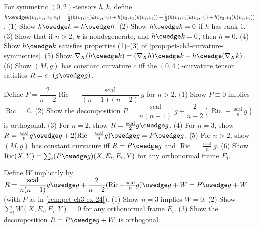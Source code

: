 \begin{remark}
  \label{rem:pet-ch3-ex-23}
  \leanok
  For symmetric $(0,2)$-tensors $h,k$, define
  $h\owedge k(v_1,v_2,v_3,v_4)=\tfrac12(h(v_1,v_4)k(v_2,v_3)+h(v_2,v_3)k(v_1,v_4))
  -\tfrac12(h(v_1,v_3)k(v_2,v_4)+h(v_2,v_4)k(v_1,v_3))$. (1) Show $h\owedge
  k=k\owedge h$. (2) Show $h\owedge h=0$ if $h$ has rank $1$. (3) Show that if
  $n>2$, $k$ is nondegenerate, and $h\owedge k=0$, then $h=0$. (4) Show $h\owedge
  k$ satisfies properties (1)--(3) of \cref{prop:pet-ch3-curvature-symmetries}.
  (5) Show $\nabla_X(h\owedge k)=(\nabla_Xh)\owedge k+h\owedge(\nabla_Xk)$. (6)
  Show $(M,g)$ has constant curvature $c$ iff the $(0,4)$-curvature tensor
  satisfies $R=c\cdot(g\owedge g)$.
\end{remark}

\begin{remark}
  \label{rem:pet-ch3-ex-24}
  \leanok
  Define $P=\dfrac2{n-2}\operatorname{Ric}-\dfrac{\operatorname{scal}}{(n-1)(n-2)}g$
  for $n>2$. (1) Show $P\equiv0$ implies $\operatorname{Ric}=0$. (2) Show the
  decomposition
  $P=\dfrac{\operatorname{scal}}{n(n-1)}g+\dfrac2{n-2}(\operatorname{Ric}-\tfrac{\operatorname{scal}}ng)$
  is orthogonal. (3) For $n=2$, show $R=\tfrac{\operatorname{scal}}2g\owedge g$.
  (4) For $n=3$, show
  $R=\tfrac{\operatorname{scal}}6g\owedge g+2(\operatorname{Ric}-\tfrac{\operatorname{scal}}3g)\owedge
  g=P\owedge g$. (5) For $n>2$, show $(M,g)$ has constant curvature iff
  $R=P\owedge g$ and $\operatorname{Ric}=\tfrac{\operatorname{scal}}ng$. (6) Show
  $\operatorname{Ric}(X,Y)=\sum_i(P\owedge g)(X,E_i,E_i,Y)$ for any orthonormal
  frame $E_i$.
\end{remark}

\begin{remark}
  \label{rem:pet-ch3-ex-25}
  \leanok
  Define $W$ implicitly by
  $R=\dfrac{\operatorname{scal}}{n(n-1)}g\owedge g+\dfrac2{n-2}(\operatorname{Ric}-\tfrac{\operatorname{scal}}ng)\owedge
  g+W=P\owedge g+W$ (with $P$ as in \cref{rem:pet-ch3-ex-24}). (1) Show $n=3$
  implies $W=0$. (2) Show $\sum_iW(X,E_i,E_i,Y)=0$ for any orthonormal frame
  $E_i$. (3) Show the decomposition $R=P\owedge g+W$ is orthogonal.
\end{remark}

